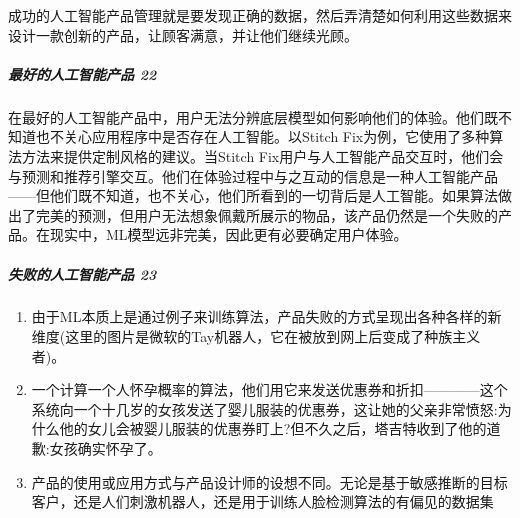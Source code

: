 \documentclass[letterpaper,11pt,english]{sphinxmanual}
\begin{document}
成功的人工智能产品管理就是要发现正确的数据，然后弄清楚如何利用这些数据来设计一款创新的产品，让顾客满意，并让他们继续光顾。%
\begin{footnote}[265]\sphinxAtStartFootnote
{}
%
\end{footnote}


\subparagraph{最好的人工智能产品 22\sphinxfootnotemark[266]}
\label{\detokenize{chapter_introduction/AI_PM:id41}}%
\begin{footnotetext}[266]\sphinxAtStartFootnote
{}
%
\end{footnotetext}\ignorespaces 
在最好的人工智能产品中，用户无法分辨底层模型如何影响他们的体验。他们既不知道也不关心应用程序中是否存在人工智能。以Stitch
Fix为例，它使用了多种算法方法来提供定制风格的建议。当Stitch
Fix用户与人工智能产品交互时，他们会与预测和推荐引擎交互。他们在体验过程中与之互动的信息是一种人工智能产品——但他们既不知道，也不关心，他们所看到的一切背后是人工智能。如果算法做出了完美的预测，但用户无法想象佩戴所展示的物品，该产品仍然是一个失败的产品。在现实中，ML模型远非完美，因此更有必要确定用户体验。


\subparagraph{失败的人工智能产品 23\sphinxfootnotemark[267]}
\label{\detokenize{chapter_introduction/AI_PM:id42}}%
\begin{footnotetext}[267]\sphinxAtStartFootnote
{}
%
\end{footnotetext}\ignorespaces \begin{enumerate}
%
\item {} 
由于ML本质上是通过例子来训练算法，产品失败的方式呈现出各种各样的新维度(这里的图片是微软的Tay机器人，它在被放到网上后变成了种族主义者)。

\item {} 
一个计算一个人怀孕概率的算法，他们用它来发送优惠券和折扣————这个系统向一个十几岁的女孩发送了婴儿服装的优惠券，这让她的父亲非常愤怒:为什么他的女儿会被婴儿服装的优惠券盯上?但不久之后，塔吉特收到了他的道歉:女孩确实怀孕了。

\item {} 
产品的使用或应用方式与产品设计师的设想不同。无论是基于敏感推断的目标客户，还是人们刺激机器人，还是用于训练人脸检测算法的有偏见的数据集

\end{enumerate}
\end{document}
